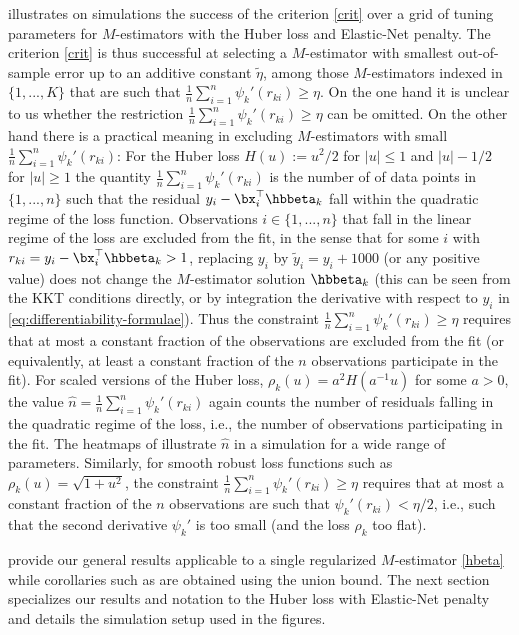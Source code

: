 \documentclass{colt2022} %
\numberwithin{equation}{section}
\begin{document}
 illustrates on simulations the success
of the criterion \eqref{crit} over a grid of tuning parameters
for $M$-estimators with the Huber loss and Elastic-Net penalty.
The criterion \eqref{crit} is thus successful
at selecting a $M$-estimator with smallest out-of-sample error
up to an additive constant $\tilde\eta$,
among those $M$-estimators indexed in $\{1,...,K\}$
that are such that $\frac 1 n \sum_{i=1}^n \psi_k'(r_{ki}) \ge \eta$.
On the one hand it is unclear to us whether the restriction
$\frac 1 n \sum_{i=1}^n \psi_k'(r_{ki}) \ge \eta$ can be omitted.
On the other hand there is a practical meaning in excluding
$M$-estimators with small $\frac 1 n \sum_{i=1}^n \psi_k'(r_{ki})$:
For the Huber loss
$H(u):= u^{2} / 2$ for $ |u| \leq 1$ and $|u| -1/2$ for $|u|\geq1$
the quantity $\frac 1 n \sum_{i=1}^n \psi_k'(r_{ki})$ is the number of 
of data points in $\{1,...,n\}$ such that the residual $y_i-\bx_i^\top\hbbeta_k$ fall within the quadratic regime of the loss function.
Observations $i\in\{1,...,n\}$ that fall in the linear regime
of the loss are excluded from the fit, in the sense 
that for some $i$ with $r_{ki} = y_i-\bx_i^\top\hbbeta_k > 1$, replacing
$y_i$ by $\tilde y_i = y_i + 1000$ (or any positive value)
does not change the $M$-estimator solution $\hbbeta_k$ 
(this can be seen from the KKT conditions directly, or by integration the
derivative with respect to $y_i$ in \eqref{eq:differentiability-formulae}).
Thus the constraint
$\frac 1 n \sum_{i=1}^n \psi_k'(r_{ki}) \ge \eta$ requires 
that at most a constant fraction of the observations 
are excluded from the fit
(or equivalently, at least a constant fraction of the $n$ observations
participate in the fit).
For scaled versions of the Huber loss,
$\rho_k(u)=a^2 H(a^{-1}u)$ for some $a>0$,
the value $\hat n = \frac 1 n \sum_{i=1}^n \psi_k'(r_{ki})$ again counts the number
of residuals falling in the quadratic regime of the loss, i.e.,
the number of observations participating in the fit.
The heatmaps of  illustrate
$\hat n$ in a simulation for a wide range of parameters.
Similarly, for smooth robust loss functions such as $\rho_k(u)=\sqrt{1+u^2}$,
the constraint $\frac 1 n \sum_{i=1}^n \psi_k'(r_{ki}) \ge \eta$
requires that at most a constant fraction of the $n$ observations are such that
$\psi_k'(r_{ki}) < \eta/2$, i.e., such that the second derivative $\psi_k'$ is too small (and the loss $\rho_k$ too flat).

provide our general results applicable to a single regularized $M$-estimator
\eqref{hbeta}
while corollaries such as
 are obtained using the union bound.
The next section specializes our results and notation to 
the Huber loss with Elastic-Net penalty and details
the simulation setup used in the figures.
\end{document}
